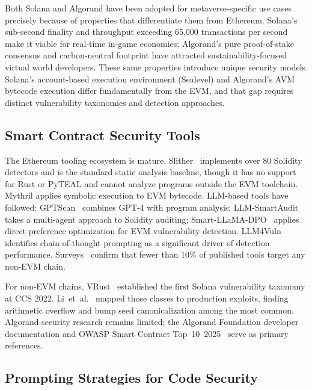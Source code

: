 \documentclass[runningheads]{llncs}
\begin{document}
Both Solana and Algorand have been adopted for metaverse-specific use cases
precisely because of properties that differentiate them from Ethereum.
Solana's sub-second finality and throughput exceeding 65{,}000 transactions per
second make it viable for real-time in-game economies; Algorand's pure
proof-of-stake consensus and carbon-neutral footprint have attracted
sustainability-focused virtual world developers.
These same properties introduce unique security models.
Solana's account-based execution environment (Sealevel) and Algorand's AVM
bytecode execution differ fundamentally from the EVM, and that gap requires
distinct vulnerability taxonomies and detection approaches.

\subsection{Smart Contract Security Tools}

The Ethereum tooling ecosystem is mature.
Slither~\cite{feist2019slither} implements over 80 Solidity detectors and is the
standard static analysis baseline, though it has no support for Rust or PyTEAL
and cannot analyze programs outside the EVM toolchain.
Mythril applies symbolic execution to EVM bytecode.
LLM-based tools have followed: GPTScan~\cite{sun2024gptscan} combines GPT-4
with program analysis; LLM-SmartAudit~\cite{wei2024llmsmartaudit} takes a
multi-agent approach to Solidity auditing; Smart-LLaMA-DPO~\cite{yu2025smartllama}
applies direct preference optimization for EVM vulnerability detection.
LLM4Vuln~\cite{liu2024llm4vuln} identifies chain-of-thought prompting as a
significant driver of detection performance.
Surveys~\cite{sheng2025llmsurvey,li2025survey} confirm that fewer than 10\%
of published tools target any non-EVM chain.

For non-EVM chains, VRust~\cite{cui2022vrust} established the first Solana
vulnerability taxonomy at CCS 2022.
Li~et~al.~\cite{li2025solana} mapped those classes to production exploits,
finding arithmetic overflow and bump seed canonicalization among the most common.
Algorand security research remains limited; the Algorand Foundation developer
documentation and OWASP Smart Contract Top~10~2025~\cite{owasp2025sc} serve as
primary references.

\subsection{Prompting Strategies for Code Security}
\end{document}
